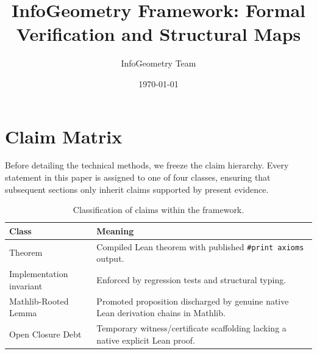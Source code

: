 \documentclass[11pt,a4paper]{article}
\title{InfoGeometry Framework: Formal Verification and Structural Maps}
\author{InfoGeometry Team}
\date{\today}
\begin{document}
\maketitle

\begin{abstract}
\end{abstract}

\section{Claim Matrix}
\label{sec:claim_matrix}

Before detailing the technical methods, we freeze the claim hierarchy. Every statement in this paper is assigned to one of four classes, ensuring that subsequent sections only inherit claims supported by present evidence.

\begin{table}[h]
\centering
\begin{tabular}{ll}
\toprule
\textbf{Class} & \textbf{Meaning} \\
\midrule
Theorem & Compiled Lean theorem with published \texttt{\#print axioms} output. \\
Implementation invariant & Enforced by regression tests and structural typing. \\
Mathlib-Rooted Lemma & Promoted proposition discharged by genuine native Lean derivation chains in Mathlib. \\
Open Closure Debt & Temporary witness/certificate scaffolding lacking a native explicit Lean proof. \\
\bottomrule
\end{tabular}
\caption{Classification of claims within the framework.}
\label{tab:claim_classes}
\end{table}
\end{document}
